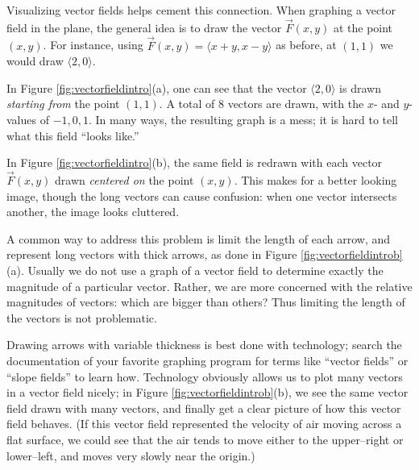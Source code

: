 Visualizing vector fields helps cement this connection. When graphing a vector field in the plane, the general idea is to draw the vector $\vec F(x,y)$ at the point $(x,y)$. For instance, using $\vec F(x,y) = \langle x+y,x-y\rangle$ as before, at $(1,1)$ we would draw $\langle 2,0\rangle$. 

In Figure \ref{fig:vectorfieldintro}(a), one can see that the vector $\langle 2,0\rangle$ is drawn \emph{starting from} the point $(1,1)$. A total of 8 vectors are drawn, with the $x$- and $y$-values of $-1,0,1$. In many ways, the resulting graph is a mess; it is hard to tell what this field ``looks like.''

In Figure \ref{fig:vectorfieldintro}(b), the same field is redrawn with each vector $\vec F(x,y)$ drawn \emph{centered on} the point $(x,y)$. This makes for a better looking image, though the long vectors can cause confusion: when one vector intersects another, the image looks cluttered.

A common way to address this problem is limit the length of each arrow, and represent long vectors with thick arrows, as done in Figure \ref{fig:vectorfieldintrob}(a). Usually we do not use a graph of a vector field to determine exactly the magnitude of a particular vector. Rather, we are more concerned with the relative magnitudes of vectors: which are bigger than others? Thus limiting the length of the vectors is not problematic.


Drawing arrows with variable thickness is best done with technology; search the documentation of your favorite graphing program for terms like ``vector fields'' or ``slope fields'' to learn how. Technology obviously allows us to plot many vectors in a vector field nicely; in Figure \ref{fig:vectorfieldintrob}(b), we see the same vector field drawn with many vectors, and finally get a clear picture of how this vector field behaves. (If this vector field represented the velocity of air moving across a flat surface, we could see that the air tends to move either to the upper--right or lower--left, and moves very slowly near the origin.)

